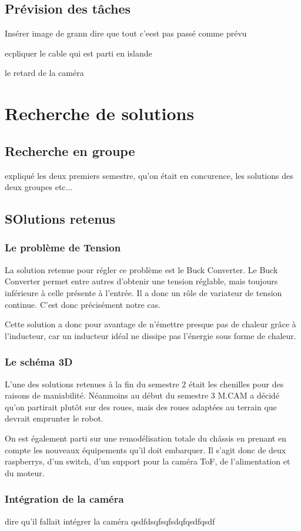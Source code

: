 \subsection{Prévision des tâches}


Insérer image de grann
dire que tout c'eest pas passé comme prévu

ecpliquer le cable qui est parti en islande


le retard de la caméra



\section{Recherche de solutions}

\subsection{Recherche en groupe}


expliqué les deux premiers semestre, qu'on était en concurence, les solutions des deux groupes etc...

\subsection{SOlutions retenus}

\subsubsection{Le problème de Tension}

La solution retenue pour régler ce problème est le Buck Converter. Le Buck Converter permet entre autres d’obtenir une tension réglable, mais toujours inférieure à celle présente à l’entrée. Il a donc un rôle de variateur de tension continue. C’est donc précisément notre cas.

Cette solution a donc pour avantage de n’émettre presque pas de chaleur grâce à l’inducteur, car un inducteur idéal ne dissipe pas l’énergie sous forme de chaleur.

\subsubsection{Le schéma 3D}

L’une des solutions retenues à la fin du semestre 2  était les chenilles pour des raisons de maniabilité. 
Néanmoins au début du semestre 3 M.CAM a décidé qu’on partirait plutôt sur des roues, mais des roues adaptées au terrain que devrait emprunter le robot.

On est également parti sur une remodélisation totale du châssis en prenant en compte les nouveaux équipements qu’il doit embarquer. Il s’agit donc de deux raspberrys, d’un switch, d’un support pour la caméra ToF, de l’alimentation et du moteur. 

\subsubsection{Intégration de la caméra}

dire qu'il fallait intégrer la caméra qsdfdsqfsqfsdqfqsdfqsdf
